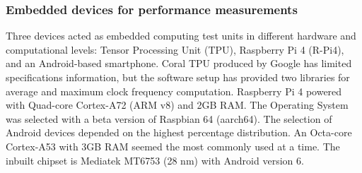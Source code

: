 \subsubsection{Embedded devices for performance measurements}
Three devices acted as embedded computing test units in different hardware and computational levels: Tensor Processing Unit (TPU), Raspberry Pi 4 (R-Pi4), and an Android-based smartphone.
Coral TPU produced by Google has limited specifications information, but the software setup has provided two libraries for average and maximum clock frequency computation.
Raspberry Pi 4 powered with Quad-core Cortex-A72 (ARM v8) and 2GB RAM.
The Operating System was selected with a beta version of Raspbian 64 (aarch64).
The selection of Android devices depended on the highest percentage distribution.
An Octa-core Cortex-A53 with 3GB RAM seemed the most commonly used at a time.
The inbuilt chipset is Mediatek MT6753 (28 nm) with Android version 6.







